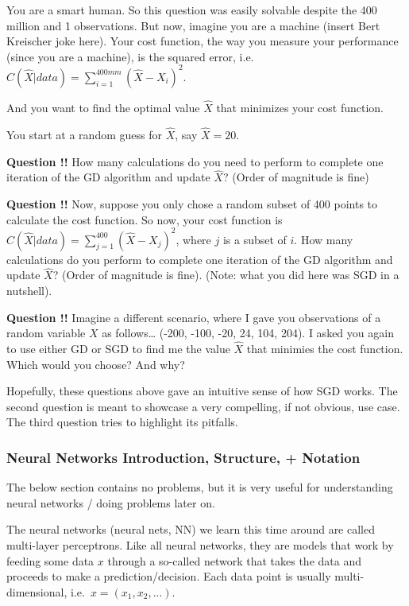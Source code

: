 \documentclass[
]{article}
\begin{document}
You are a smart human. So this question was easily solvable despite the
400 million and 1 observations. But now, imagine you are a machine
(insert Bert Kreischer joke here). Your cost function, the way you
measure your performance (since you are a machine), is the squared
error, i.e.~\(C(\hat{X}|data) = \sum_{i=1}^{400mm}(\hat{X} - X_i)^2\).

And you want to find the optimal value \(\hat{X}\) that minimizes your
cost function.

You start at a random guess for \(\hat{X}\), say \(\hat{X} = 20\).

\textbf{Question !!} How many calculations do you need to perform to
complete one iteration of the GD algorithm and update \(\hat{X}\)?
(Order of magnitude is fine)

\textbf{Question !!} Now, suppose you only chose a random subset of 400
points to calculate the cost function. So now, your cost function is
\(C(\hat{X}|data) = \sum_{j=1}^{400}(\hat{X} - X_j)^2\), where \(j\) is
a subset of \(i\). How many calculations do you perform to complete one
iteration of the GD algorithm and update \(\hat{X}\)? (Order of
magnitude is fine). (Note: what you did here was SGD in a nutshell).

\textbf{Question !!} Imagine a different scenario, where I gave you
observations of a random variable \(X\) as follows\ldots{} (-200, -100,
-20, 24, 104, 204). I asked you again to use either GD or SGD to find me
the value \(\hat{X}\) that minimies the cost function. Which would you
choose? And why?

Hopefully, these questions above gave an intuitive sense of how SGD
works. The second question is meant to showcase a very compelling, if
not obvious, use case. The third question tries to highlight its
pitfalls.

\hypertarget{neural-networks-introduction-structure-notation}{%
\subsubsection{Neural Networks Introduction, Structure, +
Notation}\label{neural-networks-introduction-structure-notation}}

The below section contains no problems, but it is very useful for
understanding neural networks / doing problems later on.

The neural networks (neural nets, NN) we learn this time around are
called multi-layer perceptrons. Like all neural networks, they are
models that work by feeding some data \(x\) through a so-called network
that takes the data and proceeds to make a prediction/decision. Each
data point is usually multi-dimensional, i.e.~\(x=(x_1,x_2,...)\).
\end{document}
